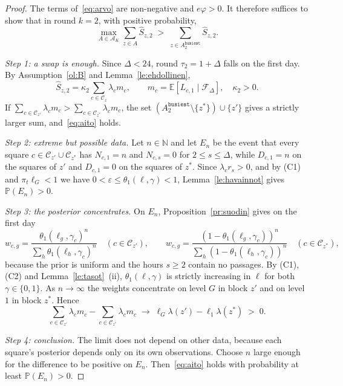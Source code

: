 \documentclass[11pt,a4paper]{article}
\theoremstyle{plain}
\theoremstyle{definition}
\theoremstyle{remark}
\newcommand{\E}{\mathbb{E}}
\renewcommand{\P}{\mathbb{P}}
\newcommand{\cC}{\mathcal{C}}
\newcommand{\cF}{\mathcal{F}}
\newcommand{\cA}{\mathcal{A}}
\newcommand{\1}{\mathbf{1}}
\newcommand{\pol}[1]{\texttt{#1}}
\begin{document}
\begin{proof}
The terms of~\eqref{eq:arvo} are non-negative and $e\varphi > 0$. It therefore
suffices to show that in round $k = 2$, with positive probability,
\begin{equation}\label{eq:aito}
  \max_{A \in \cA_K}\sum_{z \in A}\hat S_{z,2} \;>\; \sum_{z \in A^{\pol{busiest}}_2}\hat S_{z,2}.
\end{equation}

\emph{Step 1: a swap is enough.} Since $\Delta < 24$, round $\tau_2 = 1 + \Delta$
falls on the first day. By Assumption~\ref{ol:B} and Lemma~\ref{le:ehdollinen},
\[
  \hat S_{z,2} = \kappa_2 \sum_{c \in \cC_z}\lambda_c m_c,
  \qquad m_c = \E[L_{c,1} \mid \cF_{\Delta}],\quad \kappa_2 > 0.
\]
If $\sum_{c \in \cC_{z'}}\lambda_c m_c > \sum_{c \in \cC_{z^\ast}}\lambda_c m_c$,
the set $(A^{\pol{busiest}}_2 \setminus\{z^\ast\}) \cup \{z'\}$ gives a strictly
larger sum, and~\eqref{eq:aito} holds.

\emph{Step 2: extreme but possible data.} Let $n \in \mathbb{N}$ and let $E_n$ be
the event that every square $c \in \cC_{z'} \cup \cC_{z^\ast}$ has $N_{c,1} = n$ and
$N_{c,s} = 0$ for $2 \le s \le \Delta$, while $D_{c,1} = n$ on the squares of $z'$
and $D_{c,1} = 0$ on the squares of $z^\ast$. Since $\lambda_c r_s > 0$, and by (C1)
and $\pi_t\ell_G < 1$ we have $0 < \varepsilon \le \theta_1(\ell, \gamma) < 1$,
Lemma~\ref{le:havainnot} gives $\P(E_n) > 0$.

\emph{Step 3: the posterior concentrates.} On $E_n$, Proposition~\ref{pr:suodin}
gives on the first day
\[
  w_{c,g} = \frac{\theta_1(\ell_g,\gamma_c)^n}{\sum_h \theta_1(\ell_h,\gamma_c)^n}
  \quad (c \in \cC_{z'}),
  \qquad
  w_{c,g} = \frac{(1-\theta_1(\ell_g,\gamma_c))^n}{\sum_h (1-\theta_1(\ell_h,\gamma_c))^n}
  \quad (c \in \cC_{z^\ast}),
\]
because the prior is uniform and the hours $s \ge 2$ contain no passages. By (C1),
(C2) and Lemma~\ref{le:tasot}~(ii), $\theta_1(\ell, \gamma)$ is strictly
increasing in $\ell$ for both $\gamma \in \{0, 1\}$. As $n \to \infty$ the
weights concentrate on level $G$ in block $z'$ and on level $1$ in block
$z^\ast$. Hence
\[
  \sum_{c \in \cC_{z'}}\lambda_c m_c - \sum_{c \in \cC_{z^\ast}}\lambda_c m_c
  \;\longrightarrow\; \ell_G\lambda(z') - \ell_1\lambda(z^\ast) \;>\; 0.
\]

\emph{Step 4: conclusion.} The limit does not depend on other data, because each
square's posterior depends only on its own observations. Choose $n$ large enough
for the difference to be positive on $E_n$. Then~\eqref{eq:aito} holds with
probability at least $\P(E_n) > 0$.
\end{proof}
\end{document}
